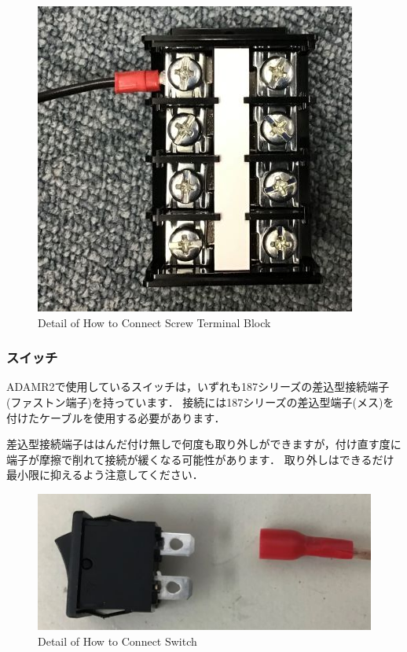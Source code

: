 \documentclass[{../../master}]{subfiles}
\begin{document}
  \begin{figure}[ht]
    \centering
    \includegraphics[width=65truemm, clip]{images/terminal.jpg}
    \caption{Detail of How to Connect Screw Terminal Block}
    \label{fig:terminal}
  \end{figure}

  \subsubsection{スイッチ}
  ADAMR2で使用しているスイッチは，いずれも187シリーズの差込型接続端子(ファストン端子)を持っています．
  接続には187シリーズの差込型端子(メス)を付けたケーブルを使用する必要があります．

  差込型接続端子ははんだ付け無しで何度も取り外しができますが，付け直す度に端子が摩擦で削れて接続が緩くなる可能性があります．
  取り外しはできるだけ最小限に抑えるよう注意してください．

  \begin{figure}[ht]
    \centering
    \includegraphics[width=65truemm, clip]{images/switch.jpg}
    \caption{Detail of How to Connect Switch}
    \label{fig:switch}
  \end{figure}
\end{document}
